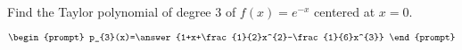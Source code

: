 \documentclass{ximera}
\author{Gregory Hartman \and Matthew Carr}
\begin{document}
\begin{exercise}




Find the Taylor polynomial of degree $3$ of $f(x)=e^{-x}$ centered at $x=0$.

\[
\begin{prompt}
p_{3}(x)=\answer{1+x+\frac{1}{2}x^{2}-\frac{1}{6}x^{3}}
\end{prompt}
\]

\end{exercise}
\end{document}

